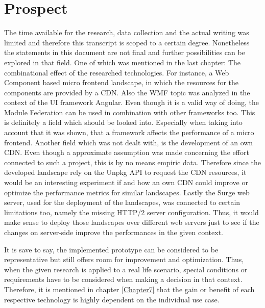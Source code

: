 \chapter{Prospect} %
\label{Chapter9}


The time available for the research, data collection and the actual writing was limited and therefore this transcript is scoped to a certain degree. Nonetheless the statements in this document are not final and further possibilities can be explored in that field. One of which was mentioned in the last chapter: The combinational effect of the researched technologies. For instance, a Web Component based micro frontend landscape, in which the resources for the components are provided by a CDN. Also the WMF topic was analyzed in the context of the UI framework Angular. Even though it is a valid way of doing, the Module Federation can be used in combination with other frameworks too. This is definitely a field which should be looked into. Especially when taking into account that it was shown, that a framework affects the performance of a micro frontend. 
Another field which was not dealt with, is the development of an own CDN. Even though a approximate assumption was made concerning the effort connected to such a project, this is by no means empiric data. Therefore since the developed landscape rely on the Unpkg API to request the CDN resources, it would be an interesting experiment if and how an own CDN could improve or optimize the performance metrics for similar landscapes.
Lastly the Surge web server, used for the deployment of the landscapes, was connected to certain limitations too, namely the missing HTTP/2 server configuration. Thus, it would make sense to deploy those landscapes over different web servers just to see if the changes on server-side improve the performances in the given context.

It is save to say, the implemented prototype can be considered to be representative but still offers room for improvement and optimization. Thus, when the given research is applied to a real life scenario, special conditions or requirements have to be considered when making a decision in that context. Therefore, it is mentioned in chapter \ref{Chapter7} that the gain or benefit of each respective technology is highly dependent on the individual use case.




